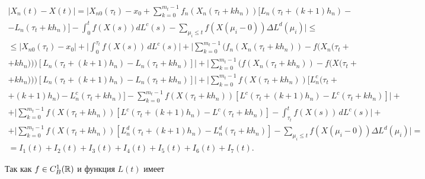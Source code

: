 \begin{gather*}


|X_n(t)-X(t)|=\bigg|X_{n0}(\tau_t)-x_0+\sum_{k=0}^{m_t-1}f_n


(X_n(\tau_t+kh_n))[L_n(\tau_t +(k+1)h_n) -\\


-L_n(\tau_t +kh_n)]-


\int_0^tf(X(s))dL^c(s)- \sum_{\mu_i \leq t }


f(X(\mu_i-0))\Delta L^d(\mu_i)\bigg|\leq\\


\le | X_{n0}(\tau_t)-


x_0|+\bigg|\int_0^{\tau_t}f(X(s))\,dL^c(s)\bigg|+


\bigg|\sum_{k=0}^{m_t-1}(f_n(X_n(\tau_t+kh_n))-f(X_n(\tau_t+\\


+kh_n)))[L_n(\tau_t+(k+1)h_n)-


L_n(\tau_t+kh_n)]\bigg|+\bigg|\sum_{k=0}^{m_t-1}(f(X_n(\tau_t+kh_n))-


f(X(\tau_t+\\


+kh_n)))[L_n(\tau_t+(k+1)h_n)- L_n(\tau_t+kh_n)]\bigg|+


\bigg|\sum_{k=0}^{m_t-1}f(X(\tau_t+kh_n))[L_n^c(\tau_t+\\


+(k+1)h_n)-L_n^c(\tau_t+kh_n)]-


\sum_{k=0}^{m_t-1}f(X(\tau_t+kh_n))[L^c(\tau_t+(k+1)h_n)-L^c(\tau_t+kh_n)]


\bigg|+\\


+\bigg| \sum_{k=0}^{m_t-1}f(X(\tau_t+kh_n))


[L^c(\tau_t+(k+1)h_n)- L^c(\tau_t+kh_n)]


-\int_{\tau_t}^tf(X(s))\,dL^c(s)\bigg|+\\


+\bigg|\sum_{k=0}^{m_t-1}f(X(\tau_t+kh_n))


[L_n^d(\tau_t+(k+1)h_n)- L_n^d(\tau_t+kh_n)]- \sum_{\mu_i


\leq t }f(X(\mu_i-0))\Delta L^d(\mu_i)\bigg|=\\


=I_1(t)+ I_2(t)+


I_3(t)+ I_4(t)+ I_5(t)+ I_6(t)+ I_7(t).


\end{gather*}


Так как $f\in C_B^1(\Bbb{R})$ и функция $L(t)$ имеет


